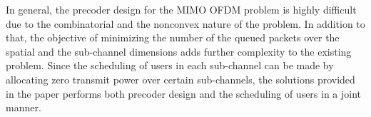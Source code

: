 

In general, the precoder design for the \ac{MIMO} \ac{OFDM} problem is highly difficult due to the combinatorial and the nonconvex nature of the problem. In addition to that, the objective of minimizing the number of the queued packets over the spatial and the sub-channel dimensions adds further complexity to the existing problem. Since the scheduling of users in each sub-channel can be made by allocating zero transmit power over certain sub-channels, the solutions provided in the paper performs both precoder design and the scheduling of users in a joint manner.
